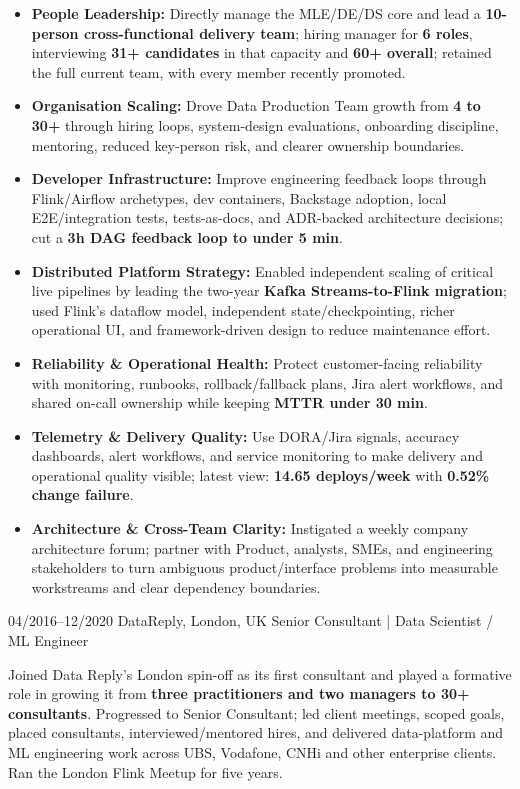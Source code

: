 \documentclass[]{../../../../friggeri-cv}
\begin{document}
\begin{entrylist}
{{        }
        \begin{itemize}[leftmargin=1.1em]
            \item \footnotesize\textbf{People Leadership:} Directly manage the MLE/DE/DS core and lead a \textbf{10-person cross-functional delivery team}; hiring manager for \textbf{6 roles}, interviewing \textbf{31+ candidates} in that capacity and \textbf{60+ overall}; retained the full current team, with every member recently promoted.
            \item \footnotesize\textbf{Organisation Scaling:} Drove Data Production Team growth from \textbf{4 to 30+} through hiring loops, system-design evaluations, onboarding discipline, mentoring, reduced key-person risk, and clearer ownership boundaries.
            \item \footnotesize\textbf{Developer Infrastructure:} Improve engineering feedback loops through Flink/Airflow archetypes, dev containers, Backstage adoption, local E2E/integration tests, tests-as-docs, and ADR-backed architecture decisions; cut a \textbf{3h DAG feedback loop to under 5 min}.
            \item \footnotesize\textbf{Distributed Platform Strategy:} Enabled independent scaling of critical live pipelines by leading the two-year \textbf{Kafka Streams-to-Flink migration}; used Flink's dataflow model, independent state/checkpointing, richer operational UI, and framework-driven design to reduce maintenance effort.
            \item \footnotesize\textbf{Reliability \& Operational Health:} Protect customer-facing reliability with monitoring, runbooks, rollback/fallback plans, Jira alert workflows, and shared on-call ownership while keeping \textbf{MTTR under 30 min}.
            \item \footnotesize\textbf{Telemetry \& Delivery Quality:} Use DORA/Jira signals, accuracy dashboards, alert workflows, and service monitoring to make delivery and operational quality visible; latest view: \textbf{14.65 deploys/week} with \textbf{0.52\% change failure}.
            \item \footnotesize\textbf{Architecture \& Cross-Team Clarity:} Instigated a weekly company architecture forum; partner with Product, analysts, SMEs, and engineering stakeholders to turn ambiguous product/interface problems into measurable workstreams and clear dependency boundaries.
        \end{itemize}
    }
    \entry
    {04/2016--12/2020}
    {DataReply, London, UK}
    {Senior Consultant | Data Scientist / ML Engineer}
    {
        {\small
        \setlength{\parindent}{0pt}
        \setlength{\leftskip}{0pt}
        Joined Data Reply's London spin-off as its first consultant and played a formative role in growing it from \textbf{three practitioners and two managers to 30+ consultants}. Progressed to Senior Consultant; led client meetings, scoped goals, placed consultants, interviewed/mentored hires, and delivered data-platform and ML engineering work across UBS, Vodafone, CNHi and other enterprise clients. Ran the London Flink Meetup for five years.

}}
\end{entrylist}
\end{document}
